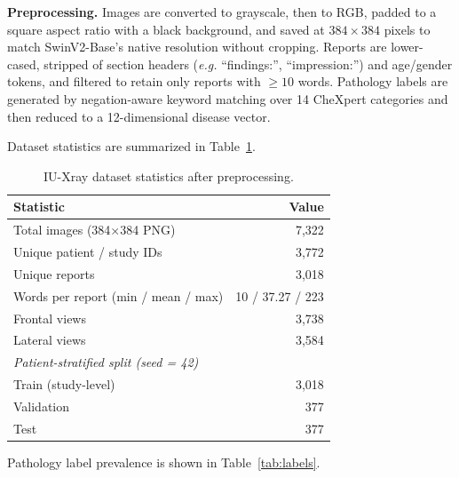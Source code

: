 \documentclass[11pt, a4paper]{article}
\newcommand{\eg}{\textit{e.g.}}
\begin{document}
\textbf{Preprocessing.}
Images are converted to grayscale, then to RGB, padded to a square aspect
ratio with a black background, and saved at $384\!\times\!384$ pixels to
match SwinV2-Base's native resolution without cropping.
Reports are lower-cased, stripped of section headers
(\eg{} ``findings:'', ``impression:'') and age/gender tokens, and filtered
to retain only reports with $\geq\!10$ words.
Pathology labels are generated by negation-aware keyword matching over 14
CheXpert categories and then reduced to a 12-dimensional disease vector.

Dataset statistics are summarized in Table~\ref{tab:dataset}.

\begin{table}[H]
  \centering
  \caption{IU-Xray dataset statistics after preprocessing.}
  \label{tab:dataset}
  \renewcommand{\arraystretch}{1.1}
  \begin{tabular}{lr}
    \toprule
    \textbf{Statistic} & \textbf{Value} \\
    \midrule
    Total images (384$\times$384 PNG) & 7,322 \\
    Unique patient / study IDs        & 3,772 \\
    Unique reports                    & 3,018 \\
    Words per report (min / mean / max) & 10 / 37.27 / 223 \\
    Frontal views                     & 3,738 \\
    Lateral views                     & 3,584 \\
    \midrule
    \multicolumn{2}{l}{\textit{Patient-stratified split (seed = 42)}} \\
    Train (study-level)  & 3,018 \\
    Validation           & 377   \\
    Test                 & 377   \\
    \bottomrule
  \end{tabular}
\end{table}

Pathology label prevalence is shown in Table~\ref{tab:labels}.
\end{document}

